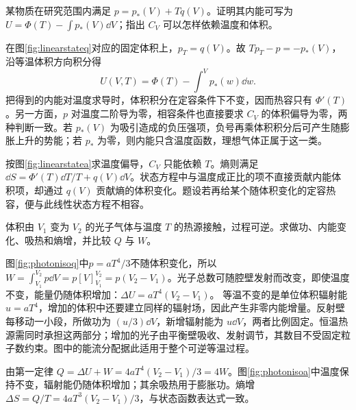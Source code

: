 \begin{exercise}[温度线性状态方程的内能体积项]
某物质在研究范围内满足 $p=p_*(V)+Tq(V)$。证明其内能可写为 $U=\Phi(T)-\int p_*(V)\dd V$；指出 $C_V$ 可以怎样依赖温度和体积。
\end{exercise}
\begin{solution}
在图\ref{fig:linearstateq}对应的固定体积上，$p_T=q(V)$。故 $Tp_T-p=-p_*(V)$，沿等温体积方向积分得
\[
 U(V,T)=\Phi(T)-\int^V p_*(w)\dd w.
\]
把得到的内能对温度求导时，体积积分在定容条件下不变，因而热容只有 $\Phi'(T)$。另一方面，$p$ 对温度二阶导为零，相容条件也直接要求 $C_V$ 的体积偏导为零，两种判断一致。若 $p_*(V)$ 为吸引造成的负压强项，负号再乘体积积分后可产生随膨胀上升的势能；若 $p_*$ 为零，则内能只含温度函数，理想气体正属于这一类。

按图\ref{fig:linearstatea}求温度偏导，$C_V$ 只能依赖 $T$。熵则满足 $\dd S=\Phi'(T)\dd T/T+q(V)\dd V$。状态方程中与温度成正比的项不直接贡献内能体积项，却通过 $q(V)$ 贡献熵的体积变化。题设若再给某个随体积变化的定容热容，便与此线性状态方程不相容。
\end{solution}

\begin{exercise}[光子气体的等温膨胀]
体积由 $V_1$ 变为 $V_2$ 的光子气体与温度 $T$ 的热源接触，过程可逆。求做功、内能变化、吸热和熵增，并比较 $Q$ 与 $W$。
\end{exercise}
\begin{solution}
图\ref{fig:photonisoq}中$p=aT^4/3$不随体积变化，所以$W=\int_{V_1}^{V_2}p\dd V=p[V]_{V_1}^{V_2}=p(V_2-V_1)$。光子总数可随腔壁发射而改变，即使温度不变，能量仍随体积增加：$\Delta U=aT^4(V_2-V_1)$。
等温不变的是单位体积辐射能 $u=aT^4$，增加的体积中还要建立同样的辐射场，因此产生非零内能增量。反射壁每移动一小段，所做功为 $(u/3)\dd V$，新增辐射能为 $u\dd V$，两者比例固定。恒温热源需同时承担这两部分；增加的光子由平衡壁吸收、发射调节，其数目不受固定粒子数约束。图中的能流分配据此适用于整个可逆等温过程。

由第一定律 $Q=\Delta U+W=4aT^4(V_2-V_1)/3=4W$。图\ref{fig:photonisoa}中温度保持不变，辐射能仍随体积增加；其余吸热用于膨胀功。熵增 $\Delta S=Q/T=4aT^3(V_2-V_1)/3$，与状态函数表达式一致。
\end{solution}

